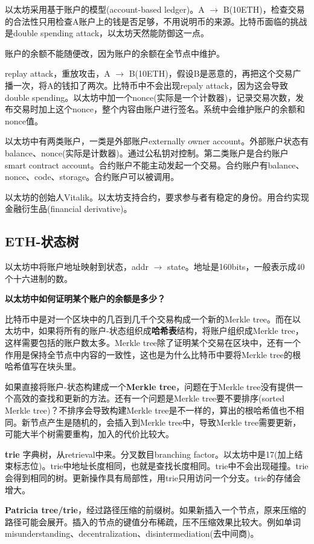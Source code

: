 \documentclass[10pt]{ctexart}
\begin{document}
以太坊采用基于账户的模型(account-based ledger)。A $\rightarrow$ B(10ETH)，检查交易的合法性只用检查A账户上的钱是否足够，不用说明币的来源。比特币面临的挑战是double spending attack，以太坊天然能防御这一点。

账户的余额不能随便改，因为账户的余额在全节点中维护。

replay attack，重放攻击，A $\rightarrow$ B(10ETH)，假设B是恶意的，再把这个交易广播一次，将A的钱扣了两次。比特币中不会出现repaly attack，因为这会导致double spending。以太坊中加一个nonce(实际是一个计数器)，记录交易次数，发布交易时加上这个nonce，整个内容由账户进行签名。系统中会维护账户的余额和nonce值。

以太坊中有两类账户，一类是外部账户externally owner account。外部账户状态有balance、nonce(实际是计数器)。通过公私钥对控制。第二类账户是合约账户smart contract account。合约账户不能主动发起一个交易。合约账户有balance、nonce、code、storage。合约账户可以被调用。

以太坊的创始人Vitalik。以太坊支持合约，要求参与者有稳定的身份。用合约实现金融衍生品(financial derivative)。

\subsection{ETH-状态树}
以太坊中将账户地址映射到状态，addr $\rightarrow$ state。地址是160bits，一般表示成40个十六进制的数。

\textbf{以太坊中如何证明某个账户的余额是多少？}

比特币中是对一个区块中的几百到几千个交易构成一个新的Merkle tree。而在以太坊中，如果将所有的账户-状态组织成\textbf{哈希表}结构，将账户组织成Merkle tree，这样需要包括的账户数太多。Merkle tree除了证明某个交易在区块中，还有一个作用是保持全节点中内容的一致性，这也是为什么比特币中要将Merkle tree的根哈希值写在块头里。

如果直接将账户-状态构建成一个\textbf{Merkle tree}，问题在于Merkle tree没有提供一个高效的查找和更新的方法。还有一个问题是Merkle tree要不要排序(sorted Merkle tree)？不排序会导致构建Merkle tree是不一样的，算出的根哈希值也不相同。新节点产生是随机的，会插入到Merkle tree中，导致Merkle tree需要更新，可能大半个树需要重构，加入的代价比较大。

\textbf{trie} 字典树，从retrieval中来。分叉数目branching factor。以太坊中是17(加上结束标志位)。trie中地址长度相同，也就是查找长度相同。trie中不会出现碰撞。trie会得到相同的树。更新操作具有局部性，用trie只用访问一个分支。trie的存储会增大。

\textbf{Patricia tree/trie}，经过路径压缩的前缀树。如果新插入一个节点，原来压缩的路径可能会展开。插入的节点的键值分布稀疏，压不压缩效果比较大。例如单词misunderstanding、decentralization、disintermediation(去中间商)。
\end{document}
